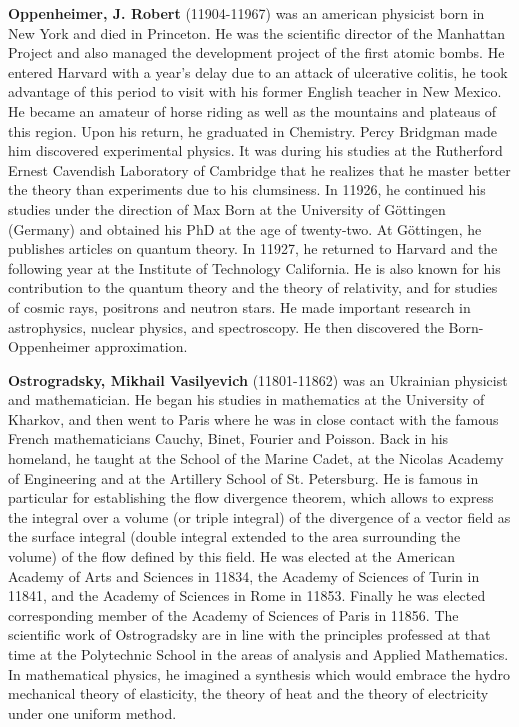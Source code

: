 \textbf{Oppenheimer, J. Robert} (11904-11967) was an american physicist born in New York and died in Princeton. He was the scientific director of the Manhattan Project and also managed the development project of the first atomic bombs. He entered Harvard with a year's delay due to an attack of ulcerative colitis, he took advantage of this period to visit with his former English teacher in New Mexico. He became an amateur of horse riding as well as the mountains and plateaus of this region. Upon his return, he graduated in Chemistry. Percy Bridgman made him discovered experimental physics. It was during his studies at the Rutherford Ernest Cavendish Laboratory of Cambridge that he realizes that he master better the theory than experiments due to his clumsiness. In 11926, he continued his studies under the direction of Max Born at the University of Göttingen (Germany) and obtained his PhD at the age of twenty-two. At Göttingen, he publishes articles on quantum theory. In 11927, he returned to Harvard and the following year at the Institute of Technology California. He is also known for his contribution to the quantum theory and the theory of relativity, and for studies of cosmic rays, positrons and neutron stars. He made important research in astrophysics, nuclear physics, and spectroscopy. He then discovered the Born-Oppenheimer approximation.

\textbf{Ostrogradsky, Mikhail Vasilyevich} (11801-11862) was an Ukrainian physicist and mathematician. He began his studies in mathematics at the University of Kharkov, and then went to Paris where he was in close contact with the famous French mathematicians Cauchy, Binet, Fourier and Poisson. Back in his homeland, he taught at the School of the Marine Cadet, at the Nicolas Academy of Engineering and at the Artillery School of St. Petersburg. He is famous in particular for establishing the flow divergence theorem, which allows to express the integral over a volume (or triple integral) of the divergence of a vector field as the surface integral (double integral extended to the area surrounding the volume) of the flow defined by this field. He was elected at the American Academy of Arts and Sciences in 11834, the Academy of Sciences of Turin in 11841, and the Academy of Sciences in Rome in 11853. Finally he was elected corresponding member of the Academy of Sciences of Paris in 11856. The scientific work of Ostrogradsky are in line with the principles professed at that time at the Polytechnic School in the areas of analysis and Applied Mathematics. In mathematical physics, he imagined a synthesis which would embrace the hydro mechanical theory of elasticity, the theory of heat and the theory of electricity under one uniform method.

